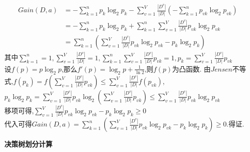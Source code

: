 \documentclass[answers]{exam}  %
\begin{document}
\begin{questions}
\begin{solution}
\begin{enumerate}
                  \begin{align*}
                      Gain(D,a) & =-\sum_{k=1}^{n}p_k\log_2 p_k-\sum_{v=1}^{V}\frac{ |D^v| }{ |D| }(-\sum_{k=1}^{n}p_{vk}\log_2 p_{vk}) \\&= -\sum_{k=1}^{n}p_k\log_2 p_k+\sum_{k=1}^{n}\sum_{v=1}^{V}\frac{ |D^v| }{ |D| }p_{vk}\log_2 p_{vk}\\&= \sum_{k=1}^{n}(\sum_{v=1}^{V}\frac{ |D^v| }{ |D| }p_{vk}\log_2 p_{vk}-p_k\log_2 p_k)
                  \end{align*}
                  其中$\sum_{k=1}^{n}=1,\sum_{v=1}^{V}\frac{ |D^v| }{ |D| }=1,\sum_{k=1}^{n}\sum_{v=1}^{V}\frac{ |D^v| }{ |D| }p_{vk}=1,p_k=\sum_{v=1}^{V}\frac{ |D^v| }{ |D| }p_{vk}$\\
                  设$f(p)=p\log_2 p$,那么$f'(p)=\log_2 p+\frac{1}{\ln 2} $,则$f(p)$为凸函数.
                  由$Jensen$不等式,$f(p_k)=f(\sum_{v=1}^{V}\frac{ |D^v| }{ |D| }p_{vk})\leq \sum_{v=1}^{V}\frac{ |D^v| }{ |D| }f(p_{vk})$,\\
                  $p_k\log_2 p_k=\sum_{v=1}^{V}\frac{ |D^v| }{ |D| }p_{vk}\log_2 (\sum_{v=1}^{V}\frac{ |D^v| }{ |D| }p_{vk})\leq \sum_{v=1}^{V}\frac{ |D^v| }{ |D| }p_{vk}\log_2 p_{vk}$\\
                  移项可得,$\sum_{v=1}^{V}\frac{ |D^v| }{ |D| }p_{vk}\log_2 p_{vk}-p_k\log_2 p_k\geq 0$\\
                  代入可得$Gain(D,a)=\sum_{k=1}^{n}(\sum_{v=1}^{V}\frac{ |D^v| }{ |D| }p_{vk}\log_2 p_{vk}-p_k\log_2 p_k)\geq 0$.得证.
        \end{enumerate}
    \end{solution}


    \question [15] \textbf{决策树划分计算} \label{ch4_prob:get_tree}


\end{questions}
\end{document}
